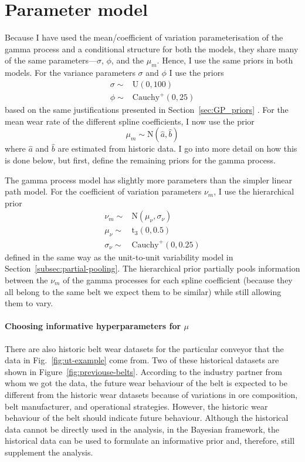 \section{Parameter model} \label{sec:belt_wear_priors}
Because I have used the mean/coefficient of variation parameterisation of the gamma process and a conditional structure for both the models, they share many of the same parameters---$\sigma$, $\phi$, and the $\mu_m$. Hence, I use the same priors in both models. For the variance parameters $\sigma$ and $\phi$ I use the priors
\begin{align*}
  \sigma \sim & \mbox{U}(0, 100)         \\
  \phi   \sim & \mbox{Cauchy}^{+}(0, 25)
\end{align*}
based on the same justifications presented in Section~\ref{sec:GP_priors} \citep[chap.~17]{BDA2020}. For the mean wear rate of the different spline coefficients, I now use the prior 
\begin{equation*}
  \mu_m \sim \mbox{N}(\hat{a}, \hat{b})
\end{equation*}
where $\hat{a}$ and $\hat{b}$ are estimated from historic data. I go into more detail on how this is done below, but first, define the remaining priors for the gamma process.

The gamma process model has slightly more parameters than the simpler linear path model. For the coefficient of variation parameters $\nu_m$, I use the hierarchical prior
\begin{align*}
  \nu_m      \sim & \mbox{N}(\mu_\nu, \sigma_\nu) \\
  \mu_\nu    \sim & \mbox{t}_3(0, 0.5)            \\
  \sigma_\nu \sim & \mbox{Cauchy}^{+}(0, 0.25)
\end{align*}
defined in the same way as the unit-to-unit variability model in Section~\ref{subsec:partial-pooling}. The hierarchical prior partially pools information between the $\nu_m$ of the gamma processes for each spline coefficient (because they all belong to the same belt we expect them to be similar) while still allowing them to vary.

\paragraph*{Choosing informative hyperparameters for $\mu$} There are also historic belt wear datasets for the particular conveyor that the data in Fig.~\ref{fig:ut-example} come from. Two of these historical datasets are shown in Figure~\ref{fig:previouse-belts}. According to the industry partner from whom we got the data, the future wear behaviour of the belt is expected to be different from the historic wear datasets because of variations in ore composition, belt manufacturer, and operational strategies. However, the historic wear behaviour of the belt should indicate future behaviour. Although the historical data cannot be directly used in the analysis, in the Bayesian framework, the historical data can be used to formulate an informative prior and, therefore, still supplement the analysis.

